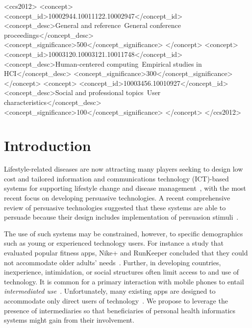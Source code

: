 \documentclass{sig-alternate}
\begin{document}
\begin{CCSXML}
<ccs2012>
<concept>
<concept_id>10002944.10011122.10002947</concept_id>
<concept_desc>General and reference~General conference proceedings</concept_desc>
<concept_significance>500</concept_significance>
</concept>
<concept>
<concept_id>10003120.10003121.10011748</concept_id>
<concept_desc>Human-centered computing~Empirical studies in HCI</concept_desc>
<concept_significance>300</concept_significance>
</concept>
<concept>
<concept_id>10003456.10010927</concept_id>
<concept_desc>Social and professional topics~User characteristics</concept_desc>
<concept_significance>100</concept_significance>
</concept>
</ccs2012>
\end{CCSXML}


%
%
%
%
\printccsdesc



\section{Introduction} 
Lifestyle-related diseases are now attracting many players seeking to design low cost and tailored information and communications technology (ICT)-based systems for supporting lifestyle change and disease management~\cite{arsand:mobile}, with the most recent focus on developing persuasive technologies. A recent comprehensive review of persuasive technologies suggested that these systems are able to persuade because their design includes implementation of persuasion stimuli~\cite{hamari2014persuasive}.

The use of such systems may be constrained, however, to specific demographics such as young or experienced technology users. For instance a study that evaluated popular fitness apps, Nike+ and RunKeeper concluded that they could not accommodate older adults' needs~\cite{silva2014:smartphones}. Further, in developing countries, inexperience, intimidation, or social structures often limit access to and use of technology. It is common for a primary interaction with mobile phones to entail \emph{intermediated use}~\cite{sambasivan2010,kumar2015mobile,katule2016:leveraging}. Unfortunately, many existing apps are designed to accommodate only direct users of technology~\cite{sambasivan2010}. We propose to leverage the presence of intermediaries so that beneficiaries of personal health informatics systems might gain from their involvement.
\end{document}
